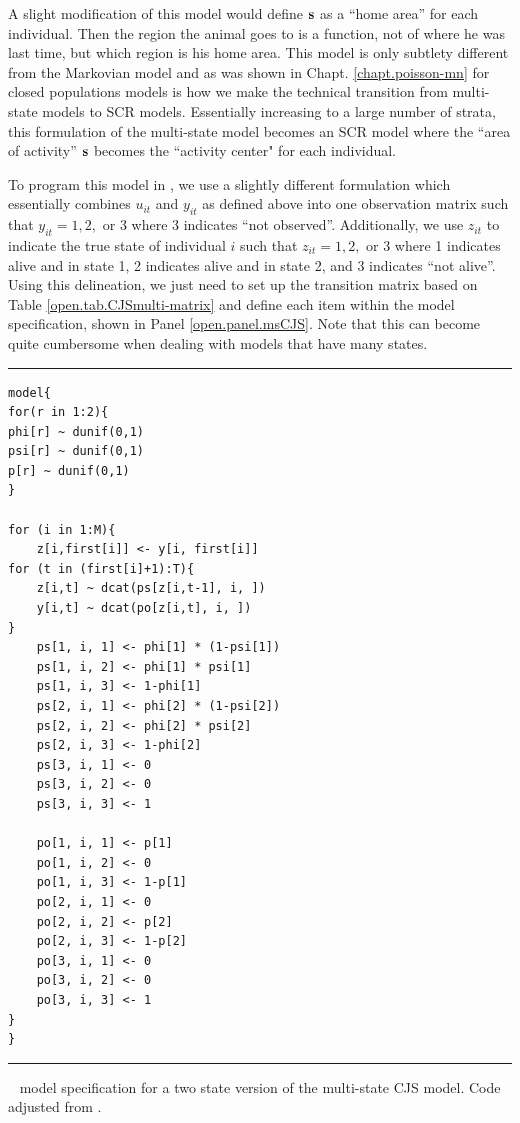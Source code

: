 A slight modification of this model would define ${\bf s}$  as a
``home area'' %
 for each individual. Then
the region the animal goes to is a function, not of where he was last time, but which region is his home area.
This model is only subtlety different from the Markovian model and as was shown in Chapt. \ref{chapt.poisson-mn}
for closed populations models is how we make the technical transition from multi-state models to SCR models.
Essentially increasing to a large number of strata, this formulation of the multi-state model becomes an SCR model
where the ``area of activity'' ${\bf s}$ becomes the ``activity center" for
each individual. 

To program this model in \jags, we use a slightly different formulation which essentially combines
$u_{it}$ and $y_{it}$ as defined above into one observation matrix such that $y_{it} = 1, 2,$ or $3$ where
3 indicates ``not observed''.  Additionally, we use $z_{it}$ to indicate the true state of individual
$i$ such that $z_{it} = 1, 2,$ or $3$ where 1 indicates alive and in state 1, 2 indicates alive and in state 2,
and 3 indicates ``not alive''.  Using this delineation, we just need to set up the transition
matrix based on Table \ref{open.tab.CJSmulti-matrix}
and define each item within the model specification, shown in Panel \ref{open.panel.msCJS}.
Note that this can become quite cumbersome when dealing with models that
have many states.


\begin{panel}[htp]
\centering
\rule[0.1in]{\textwidth}{.03in}
{\small
\begin{verbatim}
model{
for(r in 1:2){
phi[r] ~ dunif(0,1)
psi[r] ~ dunif(0,1)
p[r] ~ dunif(0,1)
}

for (i in 1:M){
    z[i,first[i]] <- y[i, first[i]]
for (t in (first[i]+1):T){
    z[i,t] ~ dcat(ps[z[i,t-1], i, ])
    y[i,t] ~ dcat(po[z[i,t], i, ])
}
	ps[1, i, 1] <- phi[1] * (1-psi[1])
	ps[1, i, 2] <- phi[1] * psi[1]
	ps[1, i, 3] <- 1-phi[1]
	ps[2, i, 1] <- phi[2] * (1-psi[2])
	ps[2, i, 2] <- phi[2] * psi[2]
	ps[2, i, 3] <- 1-phi[2]
	ps[3, i, 1] <- 0
	ps[3, i, 2] <- 0
	ps[3, i, 3] <- 1

	po[1, i, 1] <- p[1]
	po[1, i, 2] <- 0
	po[1, i, 3] <- 1-p[1]
	po[2, i, 1] <- 0
	po[2, i, 2] <- p[2]
	po[2, i, 3] <- 1-p[2]
	po[3, i, 1] <- 0
	po[3, i, 2] <- 0
	po[3, i, 3] <- 1
}
}
\end{verbatim}
}

\rule[-0.1in]{\textwidth}{.03in}
\caption{
\jags~ model specification for a two state version of the multi-state CJS model. Code adjusted
from \cite[][Chapt. 9]{kery_schaub:2011}. }
\label{open.panel.msCJS}
\end{panel}


